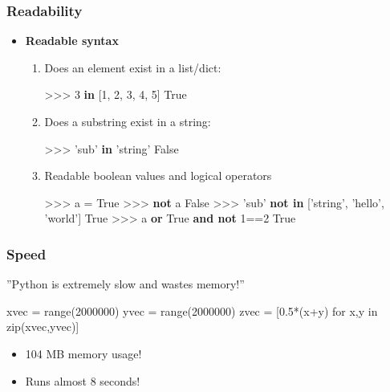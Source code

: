 \documentclass[handout]{beamer}
\begin{document}
\begin{frame}
    \frametitle{Readability}
    \begin{itemize}
        \item \textbf{Readable syntax}
        \pause
        \begin{enumerate}
            \item Does an element exist in a list/dict:
            \begin{myColorBox}{0.8}{}
\begin{semiverbatim}
>>> 3 \textbf{in} [1, 2, 3, 4, 5]
True
\end{semiverbatim}
            \end{myColorBox}
            \pause
            \item Does a substring exist in a string:
            \begin{myColorBox}{0.8}{}
\begin{semiverbatim}
>>> 'sub' \textbf{in} 'string'
False
\end{semiverbatim}
                \end{myColorBox}
            \pause
            \item Readable boolean values and logical operators
            \begin{myColorBox}{0.8}{}
\begin{semiverbatim}
>>> a = True
>>> \textbf{not} a
False
>>> 'sub' \textbf{not in} ['string', 'hello', 'world']
True
>>> a \textbf{or} True \textbf{and not} 1==2
True
\end{semiverbatim}
            \end{myColorBox}
        \end{enumerate}
    \end{itemize}
\end{frame}

\begin{frame}
    \frametitle{Speed}
    ''Python is extremely slow and wastes memory!''
\begin{myColorBox}{0.9}{}
\begin{semiverbatim}
xvec = range(2000000)
yvec = range(2000000)
zvec = [0.5*(x+y) for x,y in zip(xvec,yvec)]
\end{semiverbatim}
\end{myColorBox}
    \begin{itemize}
    	\item 104 MB memory usage!
	\item Runs almost 8 seconds!
    \end{itemize}
\end{frame}
\end{document}
